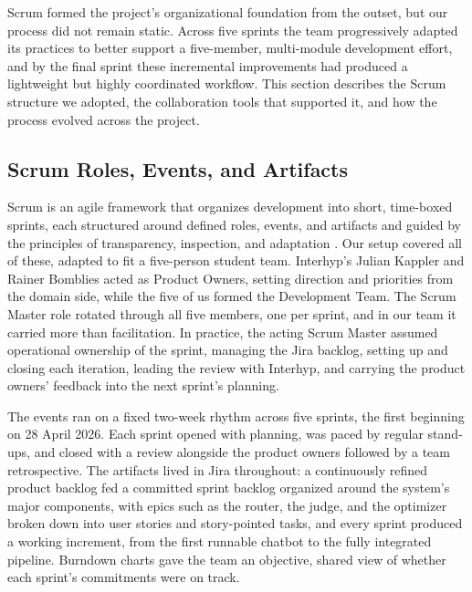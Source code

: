 \label{sec:agile-process}

Scrum formed the project's organizational foundation from the outset, but our process did not remain static. Across five sprints the team progressively adapted its practices to better support a five-member, multi-module development effort, and by the final sprint these incremental improvements had produced a lightweight but highly coordinated workflow. This section describes the Scrum structure we adopted, the collaboration tools that supported it, and how the process evolved across the project.

\subsection{Scrum Roles, Events, and Artifacts}\label{sec:scrum-roles}

Scrum is an agile framework that organizes development into short, time-boxed sprints, each structured around defined roles, events, and artifacts and guided by the principles of transparency, inspection, and adaptation \autocite{schwaber2020scrum}. Our setup covered all of these, adapted to fit a five-person student team.  Interhyp's Julian Kappler and Rainer Bomblies acted as Product Owners, setting direction and priorities from the domain side, while the five of us formed the Development Team. The Scrum Master role rotated through all five members, one per sprint, and in our team it carried more than facilitation. In practice, the acting Scrum Master assumed operational ownership of the sprint, managing the Jira backlog, setting up and closing each iteration, leading the review with Interhyp, and carrying the product owners' feedback into the next sprint's planning.

The events ran on a fixed two-week rhythm across five sprints, the first beginning on 28 April 2026. Each sprint opened with planning, was paced by regular stand-ups, and closed with a review alongside the product owners followed by a team retrospective. The artifacts lived in Jira throughout: a continuously refined product backlog fed a committed sprint backlog organized around the system's major components, with epics such as the router, the judge, and the optimizer broken down into user stories and story-pointed tasks, and every sprint produced a working increment, from the first runnable chatbot to the fully integrated pipeline. Burndown charts gave the team an objective, shared view of whether each sprint's commitments were on track.

